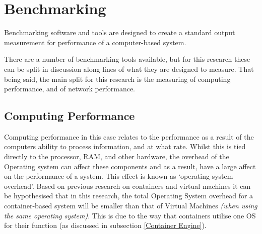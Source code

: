 \section{Benchmarking}
\label{sec:Benchmarking}
Benchmarking software and tools are designed to create a standard output measurement for performance of a computer-based system\citep{fleming1986}.

There are a  number of benchmarking tools available, but for this research these can be split in discussion along lines of what they are designed to measure. That being said, the main split for this research is the measuring of computing performance, and of network performance.

\subsection{Computing Performance}
\label{computingperformance}
Computing performance in this case relates to the performance as a result of the computers ability to process information, and at what rate. Whilst this is tied directly to the processor, RAM, and other hardware, the overhead of the Operating system can affect these components and as a result, have a large affect on the performance of a system. This effect is known as `operating system overhead'. Based on previous research on containers and virtual machines it can be hypothesised that in this research, the total Operating System overhead for a container-based system will be smaller than that of Virtual Machines \emph{(when using the same operating system)}. This is due to the way that containers utilise one OS for their function (as discussed in subsection \ref{Container Engine}).

